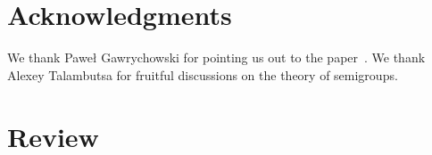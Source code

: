 \documentclass[review,onefignum,onetabnum]{siamart190516}
\begin{document}
\section*{Acknowledgments}
We thank Paweł Gawrychowski for pointing us out to the paper~\cite{DBLP:journals/ijcga/ChazelleR91}. We thank Alexey Talambutsa for fruitful discussions on the theory of semigroups.

\clearpage

\appendix
\section{Review}







\end{document}
